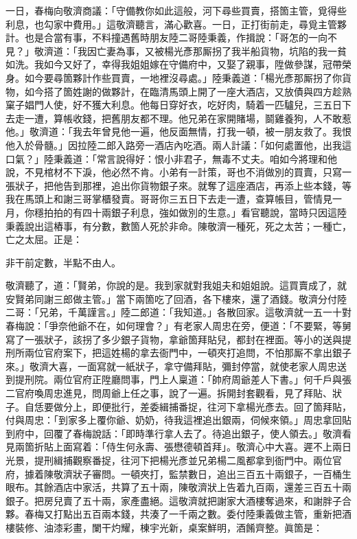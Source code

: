 一日，春梅向敬濟商議：「守備教你如此這般，河下尋些買賣，搭箇主管，覓得些利息，也勾家中費用。」這敬濟聽言，滿心歡喜。一日，正打街前走，尋覓主管夥計。也是合當有事，不料撞遇舊時朋友陸二哥陸秉義，作揖說：「哥怎的一向不見？」敬濟道：「我因亡妻為事，又被楊光彥那厮拐了我半船貨物，坑陷的我一貧如洗。我如今又好了，幸得我姐姐嫁在守備府中，又娶了親事，陞做參謀，冠帶榮身。如今要尋箇夥計作些買賣，一地裡沒尋處。」陸秉義道：「楊光彥那厮拐了你貨物，如今搭了箇姓謝的做夥計，在臨清馬頭上開了一座大酒店，又放債與四方趁熟窠子娼門人使，好不獲大利息。他每日穿好衣，吃好肉，騎着一匹驢兒，三五日下去走一遭，算帳收錢，把舊朋友都不理。{}他兄弟在家開賭場，鬬雞養狗，人不敢惹他。」敬濟道：「我去年曾見他一遍，他反面無情，打我一頓，被一朋友救了。我恨他入於骨髓。」因拉陸二郎入路旁一酒店內吃酒。兩人計議：「如何處置他，出我這口氣？」陸秉義道：「常言說得好：恨小非君子，無毒不丈夫。咱如今將理和他說，不見棺材不下淚，他必然不肯。小弟有一計策，哥也不消做別的買賣，只寫一張狀子，把他告到那裡，追出你貨物銀子來。就奪了這座酒店，再添上些本錢，等我在馬頭上和謝三哥掌櫃發賣。哥哥你三五日下去走一遭，查算帳目，管情見一月，你穩拍拍的有四十兩銀子利息，強如做別的生意。」{}看官聽說，當時只因這陸秉義說出這樁事，有分數，數箇人死於非命。陳敬濟一種死，死之太苦；一種亡，亡之太屈。正是：

\begin{myquote}
非干前定數，半點不由人。
\end{myquote}

敬濟聽了，道：「賢弟，你說的是。我到家就對我姐夫和姐姐說。這買賣成了，就安賢弟同謝三郎做主管。」當下兩箇吃了回酒，各下樓來，還了酒錢。敬濟分付陸二哥：「兄弟，千萬謹言。」陸二郎道：「我知道。」各散回家。這敬濟就一五一十對春梅說：「爭奈他爺不在，如何理會？」有老家人周忠在旁，便道：「不要緊，等舅寫了一張狀子，該拐了多少銀子貨物，拿爺箇拜貼兒，都封在裡面。等小的送與提刑所兩位官府案下，把這姓楊的拿去衙門中，一頓夾打追問，不怕那厮不拿出銀子來。」{}敬濟大喜，一面寫就一紙狀子，拿守備拜貼，彌封停當，就使老家人周忠送到提刑院。兩位官府正陞廳問事，門上人稟道：「帥府周爺差人下書。」何千戶與張二官府喚周忠進見，問周爺上任之事，說了一遍。拆開封套觀看，見了拜貼、狀子。自恁要做分上，即便批行，差委緝捕番捉，往河下拿楊光彥去。回了箇拜貼，付與周忠：「到家多上覆你爺、奶奶，待我這裡追出銀兩，伺候來領。」周忠拿回貼到府中，回覆了春梅說話：「即時準行拿人去了。待追出銀子，使人領去。」敬濟看見兩箇折貼上面寫着：「侍生何永壽、張懋德頓首拜」。敬濟心中大喜。遲不上兩日光景，提刑緝捕觀察番捉，往河下把楊光彥並兄弟楊二風都拿到衙門中。兩位官府，據着陳敬濟狀子審問。一頓夾打，監禁數日，追出三百五十兩銀子，一百桶生眼布。其餘酒店中家活，共算了五十兩，陳敬濟狀上告着九百兩，還差三百五十兩銀子。把房兒賣了五十兩，家產盡絕。這敬濟就把謝家大酒樓奪過來，和謝胖子合夥。春梅又打點出五百兩本錢，共湊了一千兩之數。委付陸秉義做主管，重新把酒樓裝修、油漆彩畫，闌干灼耀，棟宇光新，桌案鮮明，酒餚齊整。眞箇是：

